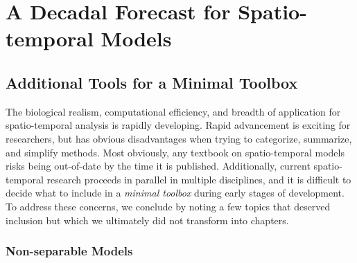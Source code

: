 \chapter{A Decadal Forecast for Spatio-temporal Models}\label{sec:Chap12_wrapup}

\section{Additional Tools for a Minimal Toolbox}

The biological realism, computational efficiency, and breadth of application for spatio-temporal analysis is rapidly developing.  Rapid advancement is exciting for researchers, but has obvious disadvantages when trying to categorize, summarize, and simplify methods.  Most obviously, any textbook on spatio-temporal models risks being out-of-date by the time it is published.  Additionally, current spatio-temporal research proceeds in parallel in multiple disciplines, and it is difficult to decide what to include in a \textit{minimal toolbox} during early stages of development.  To address these concerns, we conclude by noting a few topics that deserved inclusion but which we ultimately did not transform into chapters.  

\subsection{Non-separable Models}

